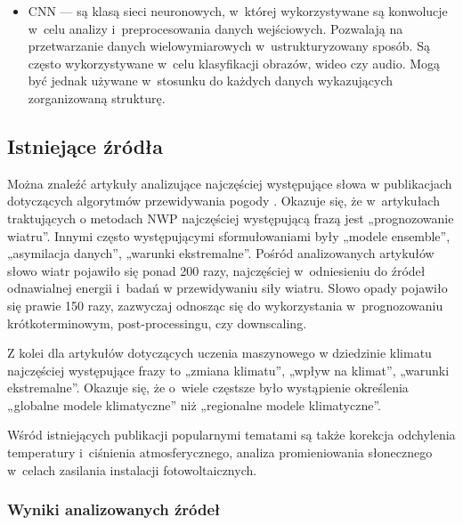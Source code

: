 \begin{itemize}
    \item CNN — są klasą sieci neuronowych, w~której wykorzystywane są konwolucje w~celu 
    analizy i~preprocesowania danych wejściowych. Pozwalają na przetwarzanie danych wielowymiarowych
    w~ustrukturyzowany sposób. Są często wykorzystywane w~celu klasyfikacji obrazów, wideo czy
    audio. Mogą być jednak używane w~stosunku do każdych danych wykazujących zorganizowaną strukturę.

\end{itemize}

\subsection{Istniejące źródła}

Można znaleźć artykuły analizujące najczęściej występujące słowa
w publikacjach dotyczących algorytmów przewidywania pogody 
\cite{ml-in-weather-prediction}. Okazuje się, że w~artykułach traktujących o
metodach NWP najczęściej występującą frazą jest „prognozowanie wiatru''. Innymi 
często występującymi sformułowaniami były „modele ensemble'', „asymilacja danych'',
„warunki ekstremalne''. Pośród analizowanych artykułów słowo wiatr pojawiło się
ponad 200 razy, najczęściej w~odniesieniu do źródeł odnawialnej energii i~badań
w przewidywaniu siły wiatru. Słowo opady pojawiło się prawie 150 razy, zazwyczaj
odnosząc się do wykorzystania w~prognozowaniu krótkoterminowym, post-processingu, czy
downscaling. 

Z kolei dla artykułów dotyczących uczenia maszynowego
w dziedzinie klimatu najczęściej występujące frazy to „zmiana klimatu'', 
„wpływ na klimat'', „warunki ekstremalne''. Okazuje się, że o~wiele częstsze było
wystąpienie określenia „globalne modele klimatyczne'' niż „regionalne modele 
klimatyczne''. 

Wśród istniejących publikacji popularnymi tematami są także korekcja odchylenia 
temperatury i~ciśnienia atmosferycznego, analiza promieniowania słonecznego w~celach
zasilania instalacji fotowoltaicznych.

\subsubsection*{Wyniki analizowanych źródeł}

